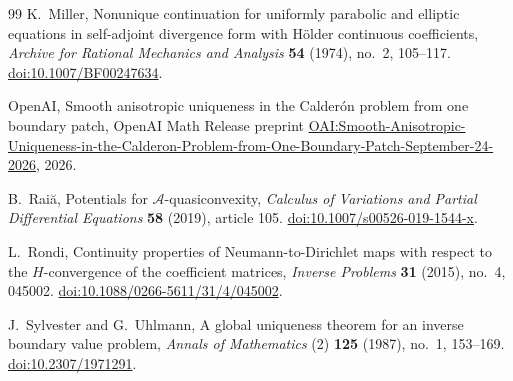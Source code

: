 \begin{thebibliography}{99}
K.~Miller,
Nonunique continuation for uniformly parabolic and elliptic equations
in self-adjoint divergence form with H\"older continuous coefficients,
\emph{Archive for Rational Mechanics and Analysis}
\textbf{54} (1974), no.~2, 105--117.
\href{https://doi.org/10.1007/BF00247634}{doi:10.1007/BF00247634}.

OpenAI,
Smooth anisotropic uniqueness in the Calder\'on problem from one boundary patch,
OpenAI Math Release preprint
\href{https://github.com/openai/math/blob/main/preprints/Smooth-Anisotropic-Uniqueness-in-the-Calderon-Problem-from-One-Boundary-Patch-September-24-2026/paper.pdf}{OAI:Smooth-Anisotropic-Uniqueness-in-the-Calderon-Problem-from-One-Boundary-Patch-September-24-2026},
2026.

B.~Rai\u a,
Potentials for $\mathcal A$-quasiconvexity,
\emph{Calculus of Variations and Partial Differential Equations}
\textbf{58} (2019), article 105.
\href{https://doi.org/10.1007/s00526-019-1544-x}
{doi:10.1007/s00526-019-1544-x}.

L.~Rondi,
Continuity properties of Neumann-to-Dirichlet maps with respect to
the $H$-convergence of the coefficient matrices,
\emph{Inverse Problems} \textbf{31} (2015), no.~4, 045002.
\href{https://doi.org/10.1088/0266-5611/31/4/045002}
{doi:10.1088/0266-5611/31/4/045002}.

J.~Sylvester and G.~Uhlmann,
A global uniqueness theorem for an inverse boundary value problem,
\emph{Annals of Mathematics} (2) \textbf{125} (1987), no.~1, 153--169.
\href{https://doi.org/10.2307/1971291}{doi:10.2307/1971291}.

\end{thebibliography}
